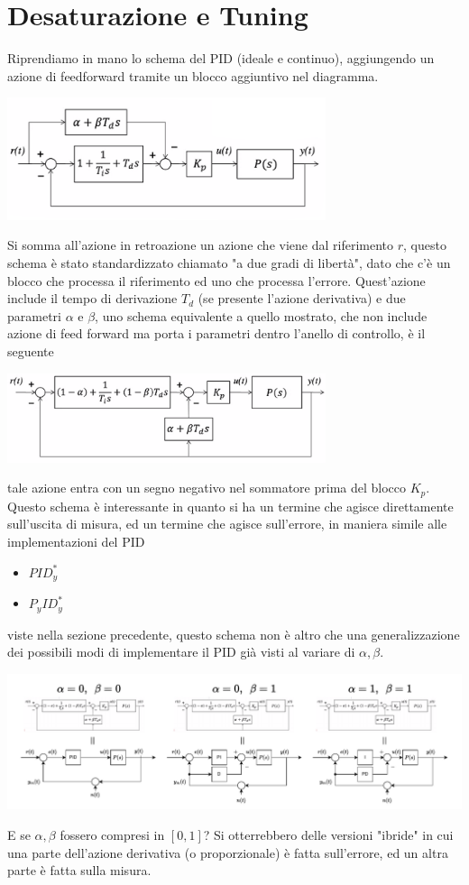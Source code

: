 \documentclass[10pt, letterpaper]{report}
\begin{document}
\section{Desaturazione e Tuning}
Riprendiamo in mano lo schema del PID (ideale e continuo), aggiungendo un azione di feedforward
tramite un blocco aggiuntivo nel diagramma.
\begin{center}
    \includegraphics[width=0.7\textwidth]{images/PIDFF.png}
\end{center}
Si somma all'azione in retroazione un azione che viene dal riferimento $r$, questo schema è stato standardizzato chiamato "a due gradi di libertà", dato che c'è un blocco che processa il riferimento ed uno che processa l'errore. \acc 
Quest'azione include il tempo di derivazione $T_d$ (se presente l'azione derivativa) e due parametri $\alpha$ e $\beta$, uno schema equivalente a quello mostrato, che non include azione di feed forward ma porta i parametri dentro l'anello di controllo, è il seguente
\begin{center}
    \includegraphics[width=0.7\textwidth]{images/PIDFF2.png}
\end{center}
tale azione entra con un segno negativo nel sommatore prima del blocco $K_p$. Questo schema è interessante in quanto si ha un termine che agisce direttamente sull'uscita di misura, ed un termine che agisce sull'errore, in maniera simile alle implementazioni del PID\begin{itemize}
    \item $PID_y^*$
    \item $P_yID_y^*$
\end{itemize} viste nella sezione precedente, questo schema non è altro che una generalizzazione dei possibili modi di implementare il PID già visti al variare di $\alpha,\beta$.\begin{center}
    \includegraphics[width=\textwidth]{images/PIDFF3.pdf}
\end{center}
E se $\alpha,\beta$ fossero compresi in $[0,1]$? Si otterrebbero delle versioni "ibride" in cui una parte dell'azione derivativa (o proporzionale) è fatta sull'errore, ed un altra parte è fatta sulla misura. 
\end{document}
